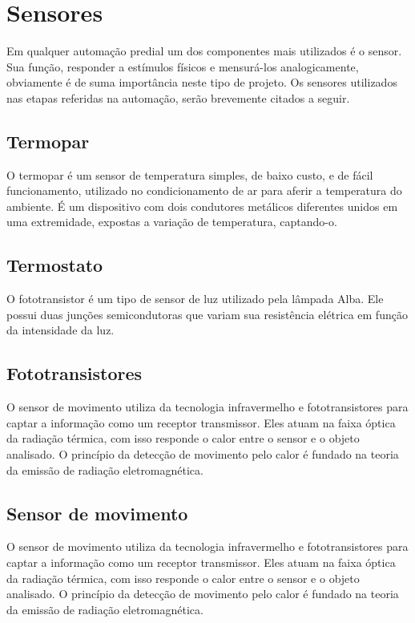 \section{Sensores}
Em qualquer automação predial um dos componentes mais utilizados é o sensor. Sua função, responder a estímulos físicos e mensurá-los analogicamente, obviamente é de suma importância neste tipo de projeto. Os sensores utilizados nas etapas referidas na automação, serão brevemente citados a seguir.

\subsection{Termopar}
O termopar é um sensor de temperatura simples, de baixo custo, e de fácil funcionamento, utilizado no condicionamento de ar para aferir a temperatura do ambiente. É um dispositivo com dois condutores metálicos diferentes unidos em uma extremidade, expostas a variação de temperatura, captando-o.

\subsection{Termostato}
O fototransistor é um tipo de sensor de luz utilizado pela lâmpada Alba. Ele possui duas junções semicondutoras que variam sua resistência elétrica em função da intensidade da luz.

\subsection{Fototransistores}
O sensor de movimento utiliza da tecnologia infravermelho e fototransistores para captar a informação como um receptor transmissor. Eles atuam na faixa óptica da radiação térmica, com isso responde o calor entre o sensor e o objeto analisado. O princípio da detecção de movimento pelo calor é fundado na teoria da emissão de radiação eletromagnética.

\subsection{Sensor de movimento}
O sensor de movimento utiliza da tecnologia infravermelho e fototransistores para captar a informação como um receptor transmissor. Eles atuam na faixa óptica da radiação térmica, com isso responde o calor entre o sensor e o objeto analisado. O princípio da detecção de movimento pelo calor é fundado na teoria da emissão de radiação eletromagnética.

